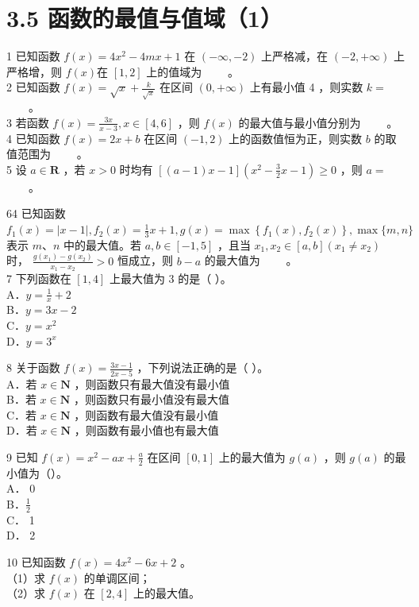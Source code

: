 \documentclass[10pt]{article}
\begin{document}
\section*{3.5 函数的最值与值域（1）}
1 已知函数 \(f(x)=4 x^{2}-4 m x+1\) 在 \((-\infty,-2)\) 上严格减，在 \((-2,+\infty)\) 上严格增，则 \(f(x)\)在 \([1,2]\) 上的值域为 \(\qquad\)。\\
2 已知函数 \(f(x)=\sqrt{x}+\frac{k}{\sqrt{x}}\) 在区间 \((0,+\infty)\) 上有最小值 4 ，则实数 \(k=\) \(\qquad\)。\\
3 若函数 \(f(x)=\frac{3 x}{x-3}, x \in[4,6]\) ，则 \(f(x)\) 的最大值与最小值分别为 \(\qquad\)。\\
4 已知函数 \(f(x)=2 x+b\) 在区间 \((-1,2)\) 上的函数值恒为正，则实数 \(b\) 的取值范围为 \(\qquad\)。\\
5 设 \(a \in \mathbf{R}\) ，若 \(x>0\) 时均有 \([(a-1) x-1]\left(x^{2}-\frac{3}{2} x-1\right) \geqslant 0\) ，则 \(a=\) \(\qquad\)。

64 已知函数 \(f_{1}(x)=|x-1|, f_{2}(x)=\frac{1}{3} x+1, g(x)=\max \left\{f_{1}(x), f_{2}(x)\right\}, \max \{m, n\}\)表示 \(m 、 n\) 中的最大值。若 \(a, b \in[-1,5]\) ，且当 \(x_{1}, x_{2} \in[a, b]\left(x_{1} \neq x_{2}\right)\) 时， \(\frac{g\left(x_{1}\right)-g\left(x_{2}\right)}{x_{1}-x_{2}}>0\) 恒成立，则 \(b-a\) 的最大值为 \(\qquad\)。\\
7 下列函数在 \([1,4]\) 上最大值为 3 的是（ ）。\\
A．\(y=\frac{1}{x}+2\)\\
B．\(y=3 x-2\)\\
C．\(y=x^{2}\)\\
D．\(y=3^{x}\)

8 关于函数 \(f(x)=\frac{3 x-1}{2 x-5}\) ，下列说法正确的是（ ）。\\
A．若 \(x \in \mathbf{N}\) ，则函数只有最大值没有最小值\\
B．若 \(x \in \mathbf{N}\) ，则函数只有最小值没有最大值\\
C．若 \(x \in \mathbf{N}\) ，则函数有最大值没有最小值\\
D．若 \(x \in \mathbf{N}\) ，则函数有最小值也有最大值

9 已知 \(f(x)=x^{2}-a x+\frac{a}{2}\) 在区间 \([0,1]\) 上的最大值为 \(g(a)\) ，则 \(g(a)\) 的最小值为（）。\\
A． 0\\
B．\(\frac{1}{2}\)\\
C． 1\\
D． 2

10 已知函数 \(f(x)=4 x^{2}-6 x+2\) 。\\
（1）求 \(f(x)\) 的单调区间；\\
（2）求 \(f(x)\) 在 \([2,4]\) 上的最大值。
\end{document}
